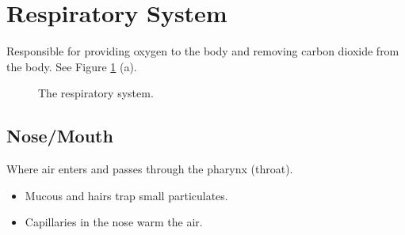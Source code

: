 \documentclass[12pt]{report}
\begin{document}
\newpage
\section{Respiratory System}
\begin{definition}
    Responsible for providing oxygen to the body and removing carbon dioxide from the body. See Figure \ref{fig:respiratory-system} (a).
\end{definition}

\begin{figure}[!htb] 
    \centering
    \qquad
    \caption{The respiratory system.}
    \label{fig:respiratory-system}
\end{figure}

\subsection{Nose/Mouth}
\begin{definition}
    Where air enters and passes through the pharynx (throat). 
    \begin{itemize}
        \item{Mucous and hairs trap small particulates.}
        \item{Capillaries in the nose warm the air.}
    \end{itemize}
\end{definition}
\end{document}
